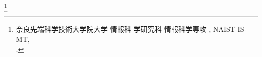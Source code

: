 \newpage
\begin{center}
 \renewcommand{\thefootnote}{\fnsymbol{footnote}}
 \Large\bfseries \jtitle \footnote[1]{奈良先端科学技術大学院大学 情報科
 学研究科 情報科学専攻 \jdoctitle, NAIST-IS-MT\studentnumber,\\ \jdate.}
 \renewcommand{\thefootnote}{\arabic{footnote}}
\end{center}

\vspace*{1truemm}

\begin{center}
 \large\jauthor
\end{center}

\vspace*{1truemm}

\begin{center}
\end{center}

\vspace*{2truemm}
\par
\jabstract
\vspace*{5truemm}

\begin{flushleft}
\end{flushleft}
\vspace{-2mm}\keywords